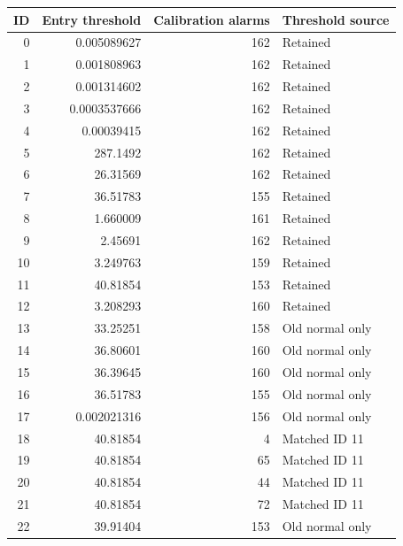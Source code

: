 \begin{tabular}{rrrl}
\toprule
ID & Entry threshold & Calibration alarms & Threshold source \\
\midrule
0 & 0.005089627 & 162 & Retained \\
1 & 0.001808963 & 162 & Retained \\
2 & 0.001314602 & 162 & Retained \\
3 & 0.0003537666 & 162 & Retained \\
4 & 0.00039415 & 162 & Retained \\
5 & 287.1492 & 162 & Retained \\
6 & 26.31569 & 162 & Retained \\
7 & 36.51783 & 155 & Retained \\
8 & 1.660009 & 161 & Retained \\
9 & 2.45691 & 162 & Retained \\
10 & 3.249763 & 159 & Retained \\
11 & 40.81854 & 153 & Retained \\
12 & 3.208293 & 160 & Retained \\
13 & 33.25251 & 158 & Old normal only \\
14 & 36.80601 & 160 & Old normal only \\
15 & 36.39645 & 160 & Old normal only \\
16 & 36.51783 & 155 & Old normal only \\
17 & 0.002021316 & 156 & Old normal only \\
18 & 40.81854 & 4 & Matched ID 11 \\
19 & 40.81854 & 65 & Matched ID 11 \\
20 & 40.81854 & 44 & Matched ID 11 \\
21 & 40.81854 & 72 & Matched ID 11 \\
22 & 39.91404 & 153 & Old normal only \\
\bottomrule
\end{tabular}
